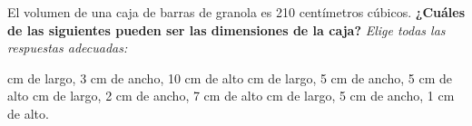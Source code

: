 El volumen de una caja de barras de granola es 210 centímetros cúbicos.
\textbf{¿Cuáles de las siguientes pueden ser las dimensiones de la caja?}
\emph{Elige todas las respuestas adecuadas:}

\begin{checkboxes}
     cm de largo, 3 cm de ancho, 10 cm de alto
     cm de largo, 5 cm de ancho, 5 cm de alto
     cm de largo, 2 cm de ancho, 7 cm de alto
     cm  de largo, 5 cm de ancho, 1 cm de alto.
\end{checkboxes}
